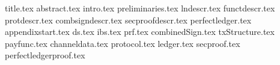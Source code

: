 \documentclass[conference,compsoc]{IEEEtran}
\begin{document}
\pagestyle{plain}
{title.tex}
{abstract.tex}
{intro.tex}
{preliminaries.tex}
{lndescr.tex}
{functdescr.tex}
{protdescr.tex}
{combsigndescr.tex}
{secproofdescr.tex}
{perfectledger.tex}
{appendixstart.tex}
{ds.tex}
{ibs.tex}
{prf.tex}
{combinedSign.tex}
{txStructure.tex}
{payfunc.tex}
{channeldata.tex}
{protocol.tex}
{ledger.tex}
{secproof.tex}
{perfectledgerproof.tex}



\end{document}
